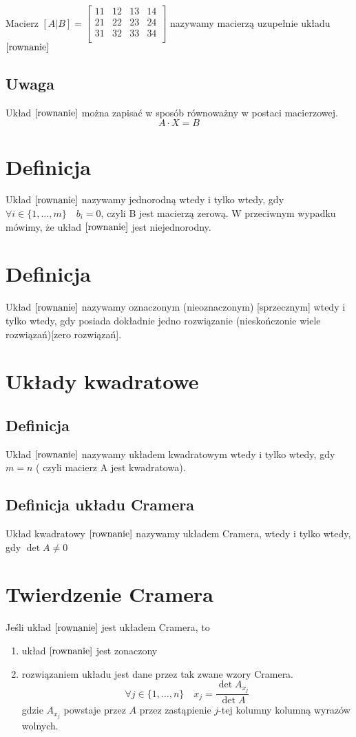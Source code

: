 \documentclass[11pt]{article}
\begin{document}
Macierz $ [A|B] = \begin{bmatrix}
	11 & 12 & 13 & 14\\
	21 & 22 & 23 & 24\\
	31 & 32 & 33 & 34\\
\end{bmatrix}$ nazywamy macierzą uzupełnie układu $\eqref{rownanie}$

\subsection{Uwaga}
Układ $\eqref{rownanie}$ można zapisać w sposób równoważny w postaci macierzowej.
$$ A \cdot X = B $$

\section{Definicja}
Układ $\eqref{rownanie}$ nazywamy jednorodną wtedy i tylko wtedy, gdy $\forall i \in  \{ 1 , \ldots , m \} \quad b_i = 0$, czyli B jest macierzą zerową. 
W przeciwnym wypadku mówimy, że układ $\eqref{rownanie}$ jest niejednorodny.
\section{Definicja}
Układ $\eqref{rownanie}$ nazywamy oznaczonym (nieoznaczonym) [sprzecznym] wtedy i tylko wtedy, gdy posiada dokładnie jedno rozwiązanie (nieskończonie wiele rozwiązań)[zero rozwiązań]. 

\section{Układy kwadratowe}
\subsection{Definicja}
Układ $\eqref{rownanie}$ nazywamy układem kwadratowym wtedy i tylko wtedy, gdy $m = n$ ( czyli macierz A jest kwadratowa).
\subsection{Definicja układu Cramera}
Układ kwadratowy $\eqref{rownanie}$ nazywamy układem Cramera, wtedy i tylko wtedy, gdy $ \det{A} \not = 0$

\section{Twierdzenie Cramera}
Jeśli układ $\eqref{rownanie}$ jest układem Cramera, to
\begin{enumerate}
\item{ układ $\eqref{rownanie}$ jest zonaczony}
\item{ rozwiązaniem układu jest dane przez tak zwane wzory Cramera.
$$ \forall j \in \{1, \ldots , n \} \quad x_j = \frac{\det{A_{x_j}}}{\det{A}}$$ gdzie $A_{x_j}$ powstaje przez $A$ przez zastąpienie $j$-tej kolumny kolumną wyrazów wolnych.}
\end{enumerate}
\end{document}
